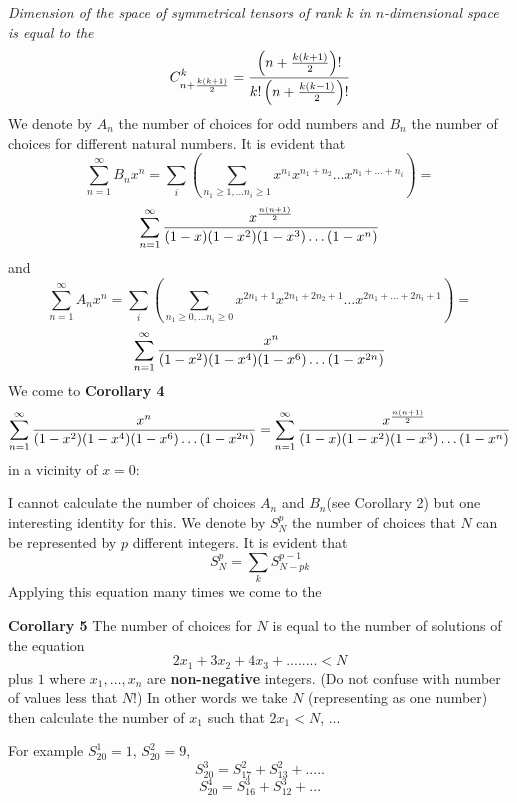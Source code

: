   {\it Dimension of the space of symmetrical tensors of rank $k$ in $n$-dimensional
   space is equal to the}
               $$
               C^k_{n+{k(k+1)\over 2}}=
                     {
                     \left(n+{k(k+1)\over 2}\right)!
                         \over
                         k!
                         \left(n+{k(k-1)\over 2}\right)!
                         }
                       $$
 We denote by $A_n$ the number of choices for odd numbers
and $B_n$ the number of choices for different natural numbers.
It is evident that
              $$
           \sum_{n=1}^\infty B_n x^n=
           \sum_i\left(
           \sum_{n_1\geq 1,\dots n_i\geq 1}
              x^{n_1}x^{n_1+n_2}\dots x^{n_1+\dots+n_i}
           \right)=
            $$
            $$
            \sum_{n=1}^\infty
                 {x^{n(n+1)\over 2}\over
   (1-x)(1-x^2)(1-x^3)\dots (1-x^n)
                 }
              $$
   and
           $$
           \sum_{n=1}^\infty A_n x^n=
           \sum_i\left(
           \sum_{n_1\geq 0,\dots n_i\geq 0}
              x^{2n_1+1}x^{2n_1+2n_2+1}\dots x^{2n_1+\dots+2n_i+1}
           \right)=
            $$
            $$
            \sum_{n=1}^\infty
                 {x^n\over
   (1-x^2)(1-x^4)(1-x^6)\dots (1-x^{2n})
                 }
              $$
       We come to
{\bf Corollary 4}
                         $$
                \sum_{n=1}^\infty
                 {x^n\over
       (1-x^2)(1-x^4)(1-x^6)\dots (1-x^{2n})
                 }=
             \sum_{n=1}^\infty
                 {x^{n(n+1)\over 2}\over
   (1-x)(1-x^2)(1-x^3)\dots (1-x^n)
                 }
                 $$
in a vicinity of $x=0$:


I cannot calculate the number of choices  $A_n$ and $B_n$(see Corollary 2)
but one interesting identity for this.
We denote by $S^p_N$ the number of choices that $N$ can be represented
by $p$ different integers.
It is evident that
                  $$
                  S^p_N=\sum_k S^{p-1}_{N-pk}
                  $$
   Applying this equation many times we come to the

   {\bf Corollary 5}
   The number of choices for $N$ is equal to the number of solutions
    of the equation
                  $$
                2x_1+3x_2+4x_3+........<N
                   $$
                   plus $1$
    where $x_1,\dots,x_n$ are {\bf non-negative} integers.
(Do not confuse with number of values less that $N$!)
In other words we take $N$ (representing as one number)
then calculate the number of $x_1$ such that
  $2x_1< N$,
  ...

  For example
   $S^1_20=1$, $S^2_20=9$,
   $$
   S^3_20=S^2_17+S^2_13+.....$$
      $$
      S^4_20=S^3_16+S^3_12+...$$




 \bye
